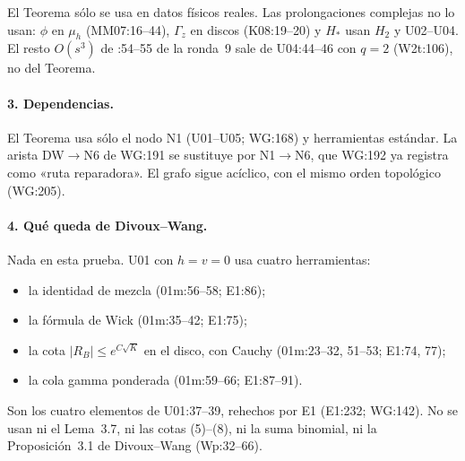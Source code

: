 El Teorema sólo se usa en datos físicos reales. Las prolongaciones complejas no lo usan: $\phi$ en
$\mu_h$ (MM07:16--44), $\Gamma_z$ en discos (K08:19--20) y $H_*$ usan $H_2$ y U02--U04. El resto
$O(s^3)$ de :54--55 de la ronda~9 sale de U04:44--46 con $q=2$
(W2t:106), no del Teorema.

\paragraph{3. Dependencias.} El Teorema usa sólo el nodo N1 (U01--U05; WG:168) y herramientas
estándar. La arista DW$\to$N6 de WG:191 se sustituye por N1$\to$N6, que WG:192 ya registra como
«ruta reparadora». El grafo sigue acíclico, con el mismo orden topológico (WG:205).

\paragraph{4. Qué queda de Divoux--Wang.} Nada en esta prueba. U01 con $h=v=0$ usa cuatro
herramientas:
\begin{itemize}
\item la identidad de mezcla (01m:56--58; E1:86);
\item la fórmula de Wick (01m:35--42; E1:75);
\item la cota $|R_B|\le e^{C\sqrt K}$ en el disco, con Cauchy (01m:23--32, 51--53; E1:74, 77);
\item la cola gamma ponderada (01m:59--66; E1:87--91).
\end{itemize}
Son los cuatro elementos de U01:37--39, rehechos por E1 (E1:232; WG:142). No se usan ni el Lema~3.7,
ni las cotas (5)--(8), ni la suma binomial, ni la Proposición~3.1 de Divoux--Wang (Wp:32--66).
